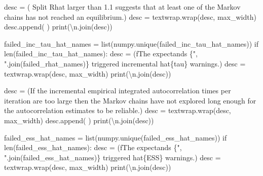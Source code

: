 \documentclass[
  letterpaper,
  DIV=11,
  numbers=noendperiod]{scrartcl}
\newenvironment{Shaded}{\begin{snugshade}}{\end{snugshade}}
\newcommand{\BuiltInTok}[1]{\textcolor[rgb]{0.00,0.23,0.31}{#1}}
\newcommand{\CharTok}[1]{\textcolor[rgb]{0.13,0.47,0.30}{#1}}
\newcommand{\ControlFlowTok}[1]{\textcolor[rgb]{0.00,0.23,0.31}{#1}}
\newcommand{\NormalTok}[1]{\textcolor[rgb]{0.00,0.23,0.31}{#1}}
\newcommand{\OperatorTok}[1]{\textcolor[rgb]{0.37,0.37,0.37}{#1}}
\newcommand{\SpecialCharTok}[1]{\textcolor[rgb]{0.37,0.37,0.37}{#1}}
\newcommand{\SpecialStringTok}[1]{\textcolor[rgb]{0.13,0.47,0.30}{#1}}
\newcommand{\StringTok}[1]{\textcolor[rgb]{0.13,0.47,0.30}{#1}}
\begin{document}
\begin{Shaded}
\begin{Highlighting}[]
\NormalTok{    desc }\OperatorTok{=}\NormalTok{ (}\StringTok{\textquotesingle{}  Split Rhat larger than 1.1 suggests that at \textquotesingle{}}
            \StringTok{\textquotesingle{}least one of the Markov chains has not reached \textquotesingle{}}
            \StringTok{\textquotesingle{}an equilibrium.\textquotesingle{}}\NormalTok{)}
\NormalTok{    desc }\OperatorTok{=}\NormalTok{ textwrap.wrap(desc, max\_width)}
\NormalTok{    desc.append(}\StringTok{\textquotesingle{} \textquotesingle{}}\NormalTok{)}
    \BuiltInTok{print}\NormalTok{(}\StringTok{\textquotesingle{}}\CharTok{\textbackslash{}n}\StringTok{\textquotesingle{}}\NormalTok{.join(desc))}

\NormalTok{  failed\_inc\_tau\_hat\_names }\OperatorTok{=} \BuiltInTok{list}\NormalTok{(numpy.unique(failed\_inc\_tau\_hat\_names))}
  \ControlFlowTok{if} \BuiltInTok{len}\NormalTok{(failed\_inc\_tau\_hat\_names):}
\NormalTok{    desc }\OperatorTok{=}\NormalTok{ (}\SpecialStringTok{f\textquotesingle{}The expectands }\SpecialCharTok{\{}\StringTok{", "}\SpecialCharTok{.}\NormalTok{join(failed\_rhat\_names)}\SpecialCharTok{\}}\SpecialStringTok{ \textquotesingle{}}
             \StringTok{\textquotesingle{}triggered incremental hat}\SpecialCharTok{\{tau\}}\StringTok{ warnings.\textquotesingle{}}\NormalTok{)}
\NormalTok{    desc }\OperatorTok{=}\NormalTok{ textwrap.wrap(desc, max\_width)}
    \BuiltInTok{print}\NormalTok{(}\StringTok{\textquotesingle{}}\CharTok{\textbackslash{}n}\StringTok{\textquotesingle{}}\NormalTok{.join(desc))}

\NormalTok{    desc }\OperatorTok{=}\NormalTok{ (}\StringTok{\textquotesingle{}If the incremental empirical integrated autocorrelation \textquotesingle{}}
            \StringTok{\textquotesingle{}times per iteration are too large then the Markov \textquotesingle{}}
            \StringTok{\textquotesingle{}chains have not explored long enough for the \textquotesingle{}}
            \StringTok{\textquotesingle{}autocorrelation estimates to be reliable.\textquotesingle{}}\NormalTok{)}
\NormalTok{    desc }\OperatorTok{=}\NormalTok{ textwrap.wrap(desc, max\_width)}
\NormalTok{    desc.append(}\StringTok{\textquotesingle{} \textquotesingle{}}\NormalTok{)}
    \BuiltInTok{print}\NormalTok{(}\StringTok{\textquotesingle{}}\CharTok{\textbackslash{}n}\StringTok{\textquotesingle{}}\NormalTok{.join(desc))}

\NormalTok{  failed\_ess\_hat\_names }\OperatorTok{=} \BuiltInTok{list}\NormalTok{(numpy.unique(failed\_ess\_hat\_names))}
  \ControlFlowTok{if} \BuiltInTok{len}\NormalTok{(failed\_ess\_hat\_names):}
\NormalTok{    desc }\OperatorTok{=}\NormalTok{ (}\SpecialStringTok{f\textquotesingle{}The expectands }\SpecialCharTok{\{}\StringTok{", "}\SpecialCharTok{.}\NormalTok{join(failed\_ess\_hat\_names)}\SpecialCharTok{\}}\SpecialStringTok{ \textquotesingle{}}
             \StringTok{\textquotesingle{}triggered hat}\SpecialCharTok{\{ESS\}}\StringTok{ warnings.\textquotesingle{}}\NormalTok{)}
\NormalTok{    desc }\OperatorTok{=}\NormalTok{ textwrap.wrap(desc, max\_width)}
    \BuiltInTok{print}\NormalTok{(}\StringTok{\textquotesingle{}}\CharTok{\textbackslash{}n}\StringTok{\textquotesingle{}}\NormalTok{.join(desc))}
    

\end{Highlighting}
\end{Shaded}
\end{document}
